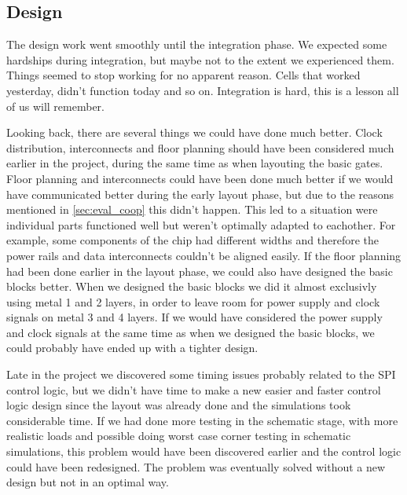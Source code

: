 \subsection{Design}
The design work went smoothly until the integration phase. We expected some hardships during integration, but maybe not to the extent we experienced them. Things seemed to stop working for no apparent reason. Cells that worked yesterday, didn't function today and so on. Integration is hard, this is a lesson all of us will remember. 

Looking back, there are several things we could have done much better. Clock distribution, interconnects and floor planning should have been considered much earlier in the project, during the same time as when layouting the basic gates. Floor planning and interconnects could have been done much better if we would have communicated better during the early layout phase, but due to the reasons mentioned in \ref{sec:eval_coop} this didn't happen. This led to a situation were individual parts functioned well but weren't optimally adapted to eachother. For example, some components of the chip had different widths and therefore the power rails and data interconnects couldn't be aligned easily. If the floor planning had been done earlier in the layout phase, we could also have designed the basic blocks better. When we designed the basic blocks we did it almost exclusivly using metal 1 and 2 layers, in order to leave room for power supply and clock signals on metal 3 and 4 layers. If we would have considered the power supply and clock signals at the same time as when we designed the basic blocks, we could probably have ended up with a tighter design.

Late in the project we discovered some timing issues probably related to the SPI control logic, but we didn't have time to make a new easier and faster control logic design since the layout was already done and the simulations took considerable time. If we had done more testing in the schematic stage, with more realistic loads and possible doing worst case corner testing in schematic simulations, this problem would have been discovered earlier and the control logic could have been redesigned. The problem was eventually solved without a new design but not in an optimal way.
